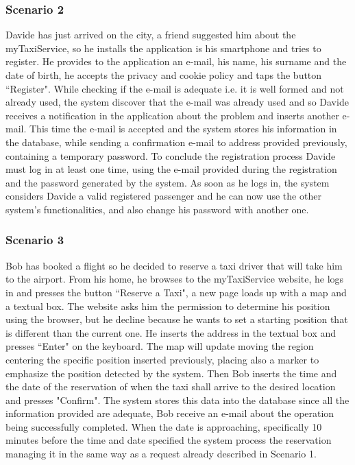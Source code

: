 \documentclass[a4paper,12pt]{article}%
\newcounter{func_req_counter}
\begin{document}
\subsubsection{Scenario 2}
Davide has just arrived on the city, a friend suggested him about the myTaxiService, so he installs the application is his smartphone and tries to register.
He provides to the application an e-mail, his name, his surname and the date of birth, he accepts the privacy and cookie policy and taps the button ``Register". While checking if the e-mail is adequate i.e. it is well formed and not already used, the system discover that the e-mail was already used and so Davide receives a notification in the application about the problem and inserts another e-mail.
This time the e-mail is accepted and the system stores his information in the database, while sending a confirmation e-mail to address provided previously, containing a temporary password.
To conclude the registration process Davide must log in at least one time, using the e-mail provided during the registration and the password generated by the system.
As soon as he logs in, the system considers Davide a valid registered passenger and he can now use the other system's functionalities, and also change his password with another one.  
\subsubsection{Scenario 3}
Bob has booked a flight so he decided to reserve a taxi driver that will take him to the airport.
From his home, he browses to the myTaxiService website, he logs in and presses the button ``Reserve a Taxi", a new page loads up with a map and a textual box.
The website asks him the permission to determine his position using the browser, but he decline because he wants to set a starting position that is different than the current one.
He inserts the address in the textual box and presses ``Enter" on the keyboard. The map will update moving the region centering the specific position inserted previously, placing also a marker to emphasize the position detected by the system.
Then Bob inserts the time and the date of the reservation of when the taxi shall arrive to the desired location and presses "Confirm".
The system stores this data into the database since all the information provided are adequate, Bob receive an e-mail about the operation being successfully completed.
When the date is approaching, specifically 10 minutes before the time and date specified the system process the reservation managing it in the same way as a request already described in Scenario 1.  
\end{document}
